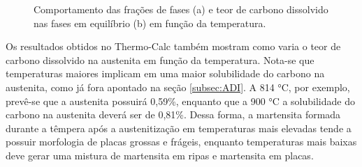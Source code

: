 \begin{figure}
	\quad
	\caption{Comportamento das frações de fases (a) e teor de carbono dissolvido nas fases em equilíbrio (b) em função da temperatura.}
	\label{fig:thermocalc}
\end{figure}

Os resultados obtidos no Thermo-Calc\textregistered{} também mostram como varia o teor de carbono dissolvido na austenita em função da temperatura. Nota-se que temperaturas maiores implicam em uma maior solubilidade do carbono na austenita, como já fora apontado na seção \ref{subsec:ADI}. A 814 °C, por exemplo, prevê-se que a austenita possuirá 0,59\%, enquanto que a 900 °C a solubilidade do carbono na austenita deverá ser de 0,81\%. Dessa forma, a martensita formada durante a têmpera após a austenitização em temperaturas mais elevadas tende a possuir morfologia de placas grossas e frágeis, enquanto temperaturas mais baixas deve gerar uma mistura de martensita em ripas e martensita em placas.

